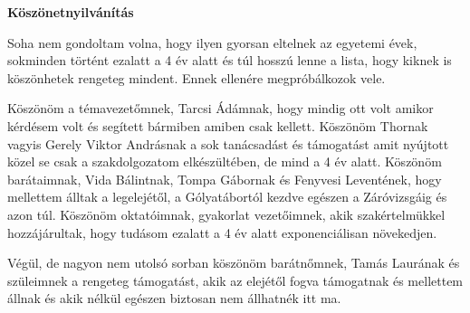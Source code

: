 
\thispagestyle{empty}

\vspace*{\fill}

{\bf \huge {Köszönetnyilvánítás}}

\vspace*{\fill}

Soha nem gondoltam volna, hogy ilyen gyorsan eltelnek az egyetemi évek, sokminden történt ezalatt a 4 év alatt és túl hosszú lenne a lista, hogy kiknek is köszönhetek rengeteg mindent. Ennek ellenére megpróbálkozok vele.

Köszönöm a témavezetőmnek, Tarcsi Ádámnak, hogy mindig ott volt amikor kérdésem volt és segített bármiben amiben csak kellett.
Köszönöm Thornak vagyis Gerely Viktor Andrásnak a sok tanácsadást és támogatást amit nyújtott közel se csak a szakdolgozatom elkészültében, de mind a 4 év alatt.
Köszönöm barátaimnak, Vida Bálintnak, Tompa Gábornak és Fenyvesi Leventének, hogy mellettem álltak a legelejétől, a Gólyatábortól kezdve egészen a Záróvizsgáig és azon túl.
Köszönöm oktatóimnak, gyakorlat vezetőimnek, akik szakértelmükkel hozzájárultak, hogy tudásom ezalatt a 4 év alatt exponenciálisan növekedjen.

Végül, de nagyon nem utolsó sorban köszönöm barátnőmnek, Tamás Laurának és szüleimnek a rengeteg támogatást, akik az elejétől fogva támogatnak és mellettem állnak és akik nélkül egészen biztosan nem állhatnék itt ma.

\vspace*{\fill}
